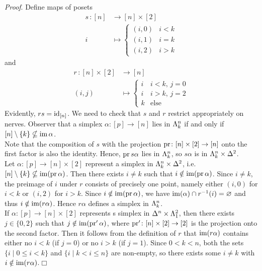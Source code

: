         \emph{Proof}. Define maps of posets
        \begin{align*}
            s \,\colon [n] &\to [n] \times [2] \\
            i &\mapsto
            \begin{cases}
                (i, 0) & i < k \\
                (i, 1) & i = k \\
                (i, 2) & i > k
            \end{cases}
        \end{align*}
        and
        \begin{align*}
            r \,\colon [n] \times [2] &\to [n]\\
            (i, j) &\mapsto
            \begin{cases}
                i & i < k, \, j = 0 \\
                i & i > k, \, j = 2 \\
                k & \text{else}
            \end{cases}
        \end{align*}
        Evidently, $rs = \operatorname{id}_{[n]}$. We need to check that $s$ and $r$ restrict appropriately on nerves. Observer that a simplex $\alpha \colon [p] \to [n]$ lies in $\Lambda^{n}_{k}$ if and only if $[n] \setminus \{k\} \nsubseteq \operatorname{im} \alpha$.\\
        Note that the composition of $s$ with the projection $\operatorname{pr} \colon [n] \times [2] \to [n]$ onto the first factor is also the identity. Hence, $\operatorname{pr} s \alpha$ lies in $\Lambda^{n}_{k}$, so $s \alpha$ is in $\Lambda^{n}_{k} \times \Delta^2$.\\
        Let $\alpha \colon [p] \to [n] \times [2]$ represent a simplex in $\Lambda^{n}_{k} \times \Delta^2$, i.e. $[n] \setminus \{k\} \nsubseteq \operatorname{im} (\operatorname{pr} \alpha)$. Then there exists $i \ne k$ such that $i \notin \operatorname{im}(\operatorname{pr} \alpha)$. Since $i \ne k$, the preimage of $i$ under $r$ consists of precisely one point, namely either $(i, 0)$ for $i < k$ or $(i, 2)$ for $i > k$. Since $i \notin \operatorname{im}(\operatorname{pr} \alpha)$, we have $\operatorname{im}(\alpha) \cap r^{-1}(i) = \varnothing$ and thus $i \notin \operatorname{im}(r \alpha)$. Hence $r \alpha$ defines a simplex in $\Lambda^{n}_{k}$.\\
        If $\alpha \colon [p] \to [n] \times [2]$ represents s simplex in $\Delta^n \times \Lambda^{2}_{1}$, then there exists $j \in \{0, 2\}$ such that $j \notin \operatorname{im}(\operatorname{pr}' \alpha)$, where $\operatorname{pr}' \colon [n] \times [2] \to [2]$ is the projection onto the second factor. Then it follows from the definition of $r$ that $\operatorname{im}(r \alpha)$ contains either no $i < k$ (if $j = 0$) or no $i > k$ (if $j = 1$). Since $0 < k < n$, both the sets $\{ i \mid 0 \leq i < k \}$ and $\{ i \mid k < i \leq n \}$ are non-empty, so there exists some $i \ne k$ with $i \notin \operatorname{im}(r \alpha)$.\hfill$\Box$

